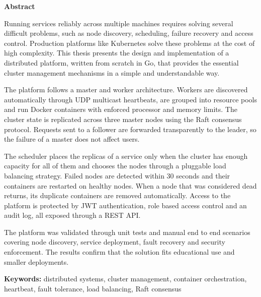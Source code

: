 \newpage
\begin{center}
    \LARGE
    \textbf{\thesistitle}

    \vspace{0.5cm}

    \authornamefl

    \vspace{1cm}

    \textbf{Abstract}

    \vspace{1cm}
\end{center}

Running services reliably across multiple machines requires solving several difficult problems, such as node discovery, scheduling, failure recovery and access control. Production platforms like Kubernetes solve these problems at the cost of high complexity. This thesis presents the design and implementation of a distributed platform, written from scratch in Go, that provides the essential cluster management mechanisms in a simple and understandable way.

The platform follows a master and worker architecture. Workers are discovered automatically through UDP multicast heartbeats, are grouped into resource pools and run Docker containers with enforced processor and memory limits. The cluster state is replicated across three master nodes using the Raft consensus protocol. Requests sent to a follower are forwarded transparently to the leader, so the failure of a master does not affect users.

The scheduler places the replicas of a service only when the cluster has enough capacity for all of them and chooses the nodes through a pluggable load balancing strategy. Failed nodes are detected within 30 seconds and their containers are restarted on healthy nodes. When a node that was considered dead returns, its duplicate containers are removed automatically. Access to the platform is protected by JWT authentication, role based access control and an audit log, all exposed through a REST API.

The platform was validated through unit tests and manual end to end scenarios covering node discovery, service deployment, fault recovery and security enforcement. The results confirm that the solution fits educational use and smaller deployments.

\vspace{1cm}

\textbf{Keywords:} distributed systems, cluster management, container orchestration, heartbeat, fault tolerance, load balancing, Raft consensus